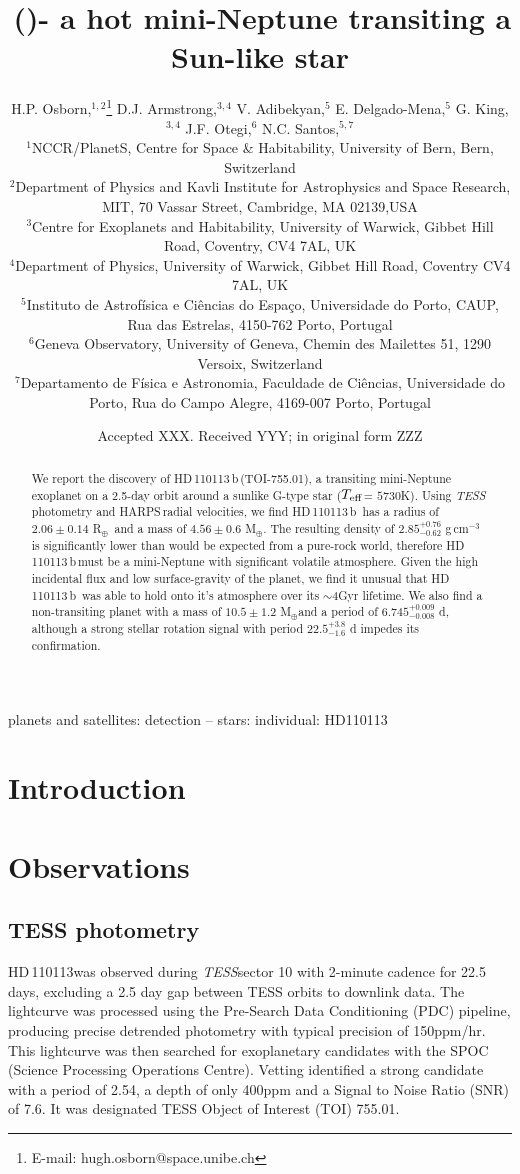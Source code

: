 \documentclass[fleqn,usenatbib]{mnras}
\title[\Tplanet]{\Tplanet\,(\TTplanet)- a hot mini-Neptune transiting a Sun-like star}
\author[H.P. Osborn et al.]{H.P. Osborn,$^{{1},{2}}$\thanks{E-mail: hugh.osborn@space.unibe.ch}
D.J. Armstrong,$^{3,4}$ %
V. Adibekyan,$^{5}$ %
E. Delgado-Mena,$^{5}$
G. King,$^{3,4}$ %
\newauthor
J.F. Otegi,$^{6}$ %
N.C. Santos,$^{5,7}$ %
\\
$^{1}$NCCR/PlanetS, Centre for Space \& Habitability, University of Bern, Bern, Switzerland\\
$^{2}$Department of Physics and Kavli Institute for Astrophysics and Space Research, MIT, 70 Vassar Street, Cambridge, MA 02139,USA\\
$^{3}$Centre for Exoplanets and Habitability, University of Warwick, Gibbet Hill Road, Coventry, CV4 7AL, UK\\
$^{4}$Department of Physics, University of Warwick, Gibbet Hill Road, Coventry CV4 7AL, UK \\
$^{5}$Instituto de Astrof\'isica e Ci\^encias do Espa\c{c}o, Universidade do Porto, CAUP, Rua das Estrelas, 4150-762 Porto, Portugal\\
$^{6}$Geneva Observatory, University of Geneva, Chemin des Mailettes 51, 1290 Versoix, Switzerland\\
$^{7}$Departamento de F\'isica e Astronomia, Faculdade de Ci\^{e}ncias, Universidade do Porto, Rua do Campo Alegre, 4169-007 Porto, Portugal\\
}
\date{Accepted XXX. Received YYY; in original form ZZZ}
\newcommand{\gcm}{g\,cm$^{-3}$}	%
\newcommand{\tess}{{\it TESS}}
\newcommand{\harps}{{HARPS}}
\newcommand{\rearth}{R$_{\oplus}$}
\newcommand{\mearth}{M$_{\oplus}$}
\newcommand{\teff}{$T_{\rm eff}$}
\newcommand{\TPone}{ $ 6.745^{+0.009}_{-0.008} $ }
\newcommand{\TMpzero}{ $ 4.56 \pm 0.6 $ }
\newcommand{\TMpone}{ $ 10.5 \pm 1.2 $ }
\newcommand{\Trplzero}{ $ 2.06 \pm 0.14 $ }
\newcommand{\Trhopgcmthreezero}{ $ 2.85^{+0.76}_{-0.62} $ }
\newcommand{\Tperiod}{ $ 22.5^{+3.8}_{-1.6} $ }
\newcommand{\TTplanet}{TOI-755.01}
\newcommand{\Tstar}{HD\,110113}
\newcommand{\Tplanet}{HD\,110113\,b}
\begin{document}
\label{firstpage}
\pagerange{\pageref{firstpage}--\pageref{lastpage}}
\maketitle

\begin{abstract}
We report the discovery of \Tplanet\,(\TTplanet), a transiting mini-Neptune exoplanet on a 2.5-day orbit around a sunlike G-type star (\teff= $5730$K).  
Using \tess\,photometry and \harps\,radial velocities, we find \Tplanet\, has a radius of \Trplzero \rearth\, and a mass of \TMpzero \mearth.
The resulting density of \Trhopgcmthreezero\gcm\,is significantly lower than would be expected from a pure-rock world, therefore \Tplanet\,must be a mini-Neptune with significant volatile atmosphere.
Given the high incidental flux and low surface-gravity of the planet, we find it unusual that \Tplanet\, was able to hold onto it's atmosphere over its $\sim4$Gyr lifetime.
We also find a non-transiting planet with a mass of \TMpone \mearth and a period of \TPone d, although a strong stellar rotation signal with period \Tperiod d impedes its confirmation.
\end{abstract}

\begin{keywords}
planets and satellites: detection -- stars: individual: HD110113
\end{keywords}



\section{Introduction}


\section{Observations}

\subsection{TESS photometry}
\Tstar was observed during \tess sector 10 with 2-minute cadence for 22.5 days, excluding a 2.5 day gap between TESS orbits to downlink data.
The lightcurve was processed using the Pre-Search Data Conditioning (PDC) pipeline, producing precise detrended photometry with typical precision of 150ppm/hr.
This lightcurve was then searched for exoplanetary candidates with the SPOC (Science Processing Operations Centre).
Vetting identified a strong candidate with a period of 2.54, a depth of only 400ppm and a Signal to Noise Ratio (SNR) of 7.6.
It was designated TESS Object of Interest (TOI) 755.01. 
\end{document}
